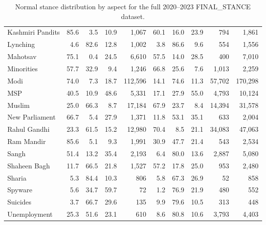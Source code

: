 \begin{table}[htbp]
\begin{tabular}{lrrrrrrrrr}
Kashmiri Pandits & 85.6 & 3.5 & 10.9 & 1,067 & 60.1 & 16.0 & 23.9 & 794 & 1,861 \\
Lynching & 4.6 & 82.6 & 12.8 & 1,002 & 3.8 & 86.6 & 9.6 & 554 & 1,556 \\
Mahotsav & 75.1 & 0.4 & 24.5 & 6,610 & 57.5 & 14.0 & 28.5 & 400 & 7,010 \\
Minorities & 57.7 & 32.9 & 9.4 & 1,246 & 66.8 & 25.6 & 7.6 & 1,013 & 2,259 \\
Modi & 74.0 & 7.3 & 18.7 & 112,596 & 14.1 & 74.6 & 11.3 & 57,702 & 170,298 \\
MSP & 40.5 & 10.9 & 48.6 & 5,331 & 17.1 & 27.9 & 55.0 & 4,793 & 10,124 \\
Muslim & 25.0 & 66.3 & 8.7 & 17,184 & 67.9 & 23.7 & 8.4 & 14,394 & 31,578 \\
New Parliament & 66.7 & 5.4 & 27.9 & 1,371 & 11.8 & 53.1 & 35.1 & 633 & 2,004 \\
Rahul Gandhi & 23.3 & 61.5 & 15.2 & 12,980 & 70.4 & 8.5 & 21.1 & 34,083 & 47,063 \\
Ram Mandir & 85.6 & 5.1 & 9.3 & 1,991 & 30.9 & 47.7 & 21.4 & 543 & 2,534 \\
Sangh & 51.4 & 13.2 & 35.4 & 2,193 & 6.4 & 80.0 & 13.6 & 2,887 & 5,080 \\
Shaheen Bagh & 11.7 & 66.5 & 21.8 & 1,527 & 57.2 & 17.8 & 25.0 & 953 & 2,480 \\
Sharia & 5.3 & 84.4 & 10.3 & 806 & 5.8 & 67.3 & 26.9 & 52 & 858 \\
Spyware & 5.6 & 34.7 & 59.7 & 72 & 1.2 & 76.9 & 21.9 & 480 & 552 \\
Suicides & 3.7 & 66.7 & 29.6 & 135 & 9.9 & 79.6 & 10.5 & 313 & 448 \\
Unemployment & 25.3 & 51.6 & 23.1 & 610 & 8.6 & 80.8 & 10.6 & 3,793 & 4,403 \\
\bottomrule
\end{tabular}
\caption{Normal stance distribution by aspect for the full 2020--2023 FINAL\_STANCE dataset.}
\label{tab:normal-full-keyword-stance}
\end{table}
